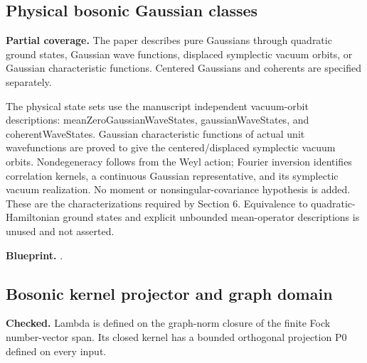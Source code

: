 \subsection{Physical bosonic Gaussian classes}\label{paper:boson-gaussian}
\textbf{Partial coverage.} The paper describes pure Gaussians through quadratic ground states, Gaussian wave functions, displaced symplectic vacuum orbits, or Gaussian characteristic functions. Centered Gaussians and coherents are specified separately. 

The physical state sets use the manuscript independent vacuum-orbit descriptions: meanZeroGaussianWaveStates, gaussianWaveStates, and coherentWaveStates. Gaussian characteristic functions of actual unit wavefunctions are proved to give the centered/displaced symplectic vacuum orbits. Nondegeneracy follows from the Weyl action; Fourier inversion identifies correlation kernels, a continuous Gaussian representative, and its symplectic vacuum realization. No moment or nonsingular-covariance hypothesis is added. These are the characterizations required by Section 6. Equivalence to quadratic-Hamiltonian ground states and explicit unbounded mean-operator descriptions is unused and not asserted.


\textbf{Blueprint.} .

\subsection{Bosonic kernel projector and graph domain}\label{paper:lambda-b}
\textbf{Checked.} Lambda is defined on the graph-norm closure of the finite Fock number-vector span. Its closed kernel has a bounded orthogonal projection P0 defined on every input. 

